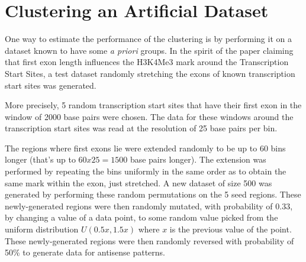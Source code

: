 \documentclass[parskip]{cs4rep}
\begin{document}
\section{Clustering an Artificial Dataset}
One way to estimate the performance of the clustering is by performing it on a dataset known to have some \emph{a priori} groups. In the spirit of the paper claiming that first exon length influences the H3K4Me3 mark around the Transcription Start Sites\cite{Bieberstein:2012tf}, a test dataset randomly stretching the exons of known transcription start sites was generated.

More precisely, 5 random transcription start sites that have their first exon in the window of 2000 base pairs were chosen.  The data for these windows around the transcription start sites was read at the resolution of 25 base pairs per bin. 

The regions where first exons lie were extended randomly to be up to 60 bins longer (that's up to $60x25=1500$ base pairs longer). The extension was performed by repeating the bins uniformly in the same order as to obtain the same mark within the exon, just stretched. A new dataset of size 500 was generated by performing these random permutations on the 5 seed regions. 
These newly-generated regions were then randomly mutated, with probability of $0.33$, by changing a value of a data point, to some random value picked from the uniform distribution $U(0.5x, 1.5x)$ where $x$ is the previous value of the point. These newly-generated regions were then randomly reversed with probability of 50\% to generate data for antisense patterns.
\end{document}
